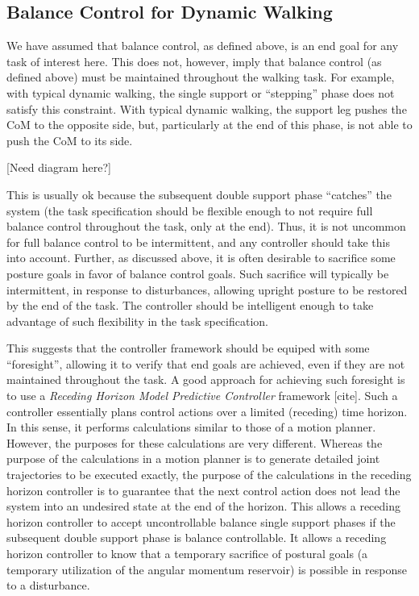 \documentclass{llncs}
\begin{document}
\subsection{Balance Control for Dynamic Walking}

We have assumed that balance control, as defined above, is an end goal for any task of interest here.
This does not, however, imply that balance control (as defined above) must be maintained throughout the
walking task.
For example, with typical dynamic walking, the single support or ``stepping'' phase does not satisfy this constraint.
With typical dynamic walking, the support leg pushes the CoM to the opposite side, but, particularly at the end of this phase,
is not able to push the CoM to its side.

[Need diagram here?]

This is usually ok because the subsequent double support phase ``catches'' the system
(the task specification should be flexible enough to not require full balance control throughout the task, only at the end).
Thus, it is not uncommon for full balance control to be intermittent, and any controller should take this into account.
Further, as discussed above, it is often desirable to sacrifice some posture goals in favor of balance control goals.
Such sacrifice will typically be intermittent, in response to disturbances, allowing upright posture to be restored
by the end of the task.
The controller should be intelligent enough to take advantage of such flexibility in the task specification.

This suggests that the controller framework should be equiped with some ``foresight'', allowing it to verify that end
goals are achieved, even if they are not maintained throughout the task.
A good approach for achieving such foresight is to use a \textit{Receding Horizon Model Predictive Controller} framework [cite].
Such a controller essentially plans control actions over a limited (receding) time horizon.
In this sense, it performs calculations similar to those of a motion planner.
However, the purposes for these calculations are very different.
Whereas the purpose of the calculations in a motion planner is to generate detailed joint trajectories to be executed exactly, 
the purpose of the calculations in the receding horizon controller is to guarantee that the next control action does not
lead the system into an undesired state at the end of the horizon.
This allows a receding horizon controller to accept uncontrollable balance single support phases if the subsequent double support
phase is balance controllable.
It allows a receding horizon controller to know that a temporary sacrifice of postural goals (a temporary utilization of the 
angular momentum reservoir) is possible in response to a disturbance.
\end{document}
